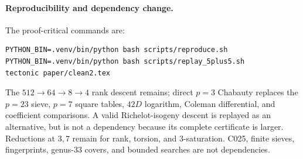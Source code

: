 \documentclass[11pt]{article}
\begin{document}
\begingroup\small
\paragraph{Reproducibility and dependency change.}
The proof-critical commands are:
\begin{verbatim}
PYTHON_BIN=.venv/bin/python bash scripts/reproduce.sh
PYTHON_BIN=.venv/bin/python bash scripts/replay_5plus5.sh
tectonic paper/clean2.tex
\end{verbatim}
The \(512\to64\to8\to4\) rank descent remains; direct \(p=3\) Chabauty
replaces the \(p=23\) sieve, \(p=7\) square tables, \(42D\) logarithm, Coleman
differential, and coefficient comparisons.  A valid Richelot-isogeny descent
is replayed as an alternative, but is not a dependency because its complete
certificate is larger.  Reductions at \(3,7\) remain for rank, torsion, and
\(3\)-saturation.  C025, finite sieves, fingerprints, genus-$33$ covers, and
bounded searches are not dependencies.
\endgroup
\end{document}
